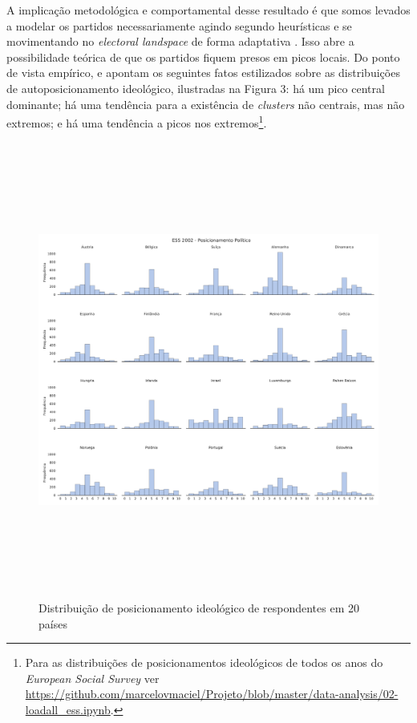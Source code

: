 A implicação metodológica e comportamental desse resultado é que somos levados a
modelar os partidos necessariamente agindo segundo heurísticas e se movimentando
no \textit{electoral landspace} de forma adaptativa \cite{kollman1998political,
  de1999adaptive}. Isso abre a possibilidade teórica de que os partidos fiquem
presos em picos locais. Do ponto de vista empírico,
 e  apontam os seguintes
fatos estilizados sobre as distribuições de autoposicionamento ideológico,
ilustradas na Figura 3: há um pico central dominante; há uma tendência para a
existência de \textit{clusters} não centrais, mas não extremos; e há uma
tendência a picos nos extremos\footnote{Para as distribuições de posicionamentos
  ideológicos de todos os anos do \textit{European Social Survey} ver
  \url{https://github.com/marcelovmaciel/Projeto/blob/master/data-analysis/02-loadall_ess.ipynb}.}.

\begin{figure}[H]
  \centering
  \caption{Distribuição de posicionamento ideológico de respondentes em 20 países}
  \includegraphics[width= \textwidth, height = 15cm]{ims/ess_2002_plots.pdf}
\end{figure}

